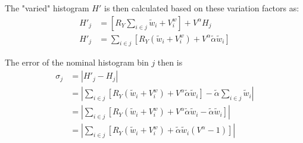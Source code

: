 The "varied" histogram $H'$ is then calculated based on these variation factors as:
    \begin{equation} \begin{split}
    H'_j &= \left[ R_Y \sum_{i \in j} \tilde w_i + V^w_i \right] + V^{\alpha} H_j
    \\H'_j &= \sum_{i \in j} \left[ R_Y \left( \tilde w_i + V^w_i \right)
        + V^{\alpha} \tilde \alpha \tilde w_i \right]
    \end{split} \end{equation}

The error of the nominal histogram bin $j$ then is
    \begin{equation} \begin{split}
    \sigma_j &= | H'_j - H_j |
    \\&= \left| \sum_{i \in j} \left[
        R_Y \left( \tilde w_i + V^w_i \right)
        + V^{\alpha} \tilde \alpha \tilde w_i \right] 
        -\tilde \alpha \sum_{i \in j} \tilde w_i \right|
    \\&= \left| \sum_{i \in j} \left[
        R_Y \left( \tilde w_i + V^w_i \right)
        + V^{\alpha} \tilde \alpha \tilde w_i 
        - \tilde \alpha \tilde w_i
        \right] \right|
    \\&= \left| \sum_{i \in j} \left[
        R_Y \left( \tilde w_i + V^w_i \right) 
        + \tilde \alpha \tilde w_i (V^{\alpha}-1) \right] \right|
    \end{split} \end{equation}




